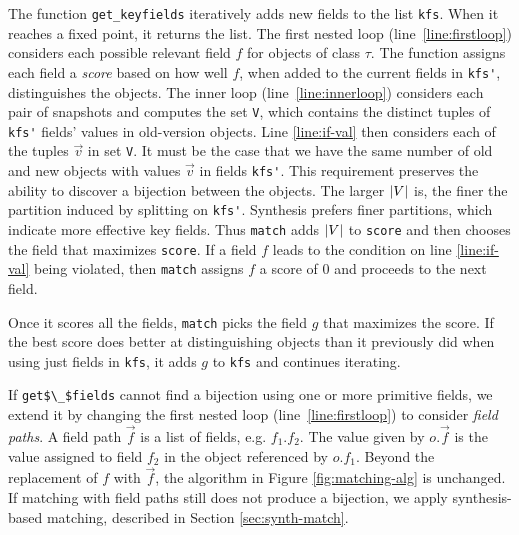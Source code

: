\documentclass[natbib,10pt]{sigplanconf}
\newcommand{\code}[1]{\lstinline|#1|\xspace}
\begin{document}
The function \code{get_keyfields} iteratively adds new fields to the
list \code{kfs}. When it reaches a fixed point, it returns the list.
The first nested loop (line~\ref{line:firstloop}) considers each
possible relevant field $f$ for objects of class $\tau$.  The function
assigns each field a \emph{score} based on how well $f$, when added to
the current fields in \code{kfs'}, distinguishes the objects.  The
inner loop (line~\ref{line:innerloop}) considers each pair of
snapshots and computes the set \code{V}, which contains the distinct
tuples of \code{kfs'} fields' values in old-version objects.  Line \ref{line:if-val}
then considers each of the tuples $\vec{v}$ in set \code{V}.  It must be the case
that we have the same number of old and new objects with values
$\vec{v}$ in fields \code{kfs'}.  This requirement preserves the ability to discover a
bijection between the objects. The larger $\lvert V \rvert$ is,
the finer the partition induced by splitting on \code{kfs'}.  Synthesis
prefers finer partitions, which indicate more effective key fields.  Thus
\code{match} adds $\lvert V \rvert$ to \code{score} and then chooses the field that
maximizes \code{score}.  If a field $f$ leads to the condition
on line \ref{line:if-val} being violated, then \code{match} assigns $f$ a score of 0 and
proceeds to the next field.

Once it scores all the fields, \code{match} picks the
field $g$ that maximizes the score.  If the best score does better at
distinguishing objects than it previously did when using just fields
in \code{kfs}, it adds $g$ to \code{kfs} and continues iterating.

If \code{get$\_$fields} cannot find a bijection using one or more
primitive fields, we extend it by changing the first nested loop
(line~\ref{line:firstloop}) to consider \emph{field paths}. A field
path $\vec{f}$ is a list of fields, e.g. $f_1.f_2$.  The value given
by $o.\vec{f}$ is the value assigned to field $f_2$ in the object
referenced by $o.f_1$.  Beyond the replacement of $f$ with $\vec{f}$,
the algorithm in Figure \ref{fig:matching-alg} is unchanged.  If
matching with field paths still does not produce a bijection, we apply
synthesis-based matching, described in Section \ref{sec:synth-match}.

\end{document}
